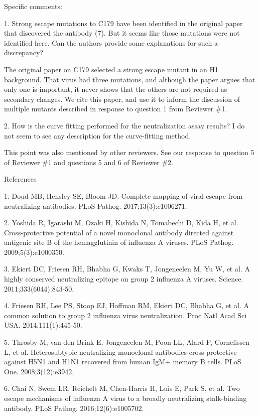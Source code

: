 \documentclass[11pt, oneside]{article}   	%
\begin{document}
Specific comments:

1.  Strong escape mutations to C179 have been identified in the original paper that discovered the antibody (7). But it seems like those mutations were not identified here. Can the authors provide some explanations for such a discrepancy?

{\color{black}
The original paper on C179 selected a strong escape mutant in an H1 background.
That virus had three mutations, and although the paper argues that only one is important, it never shows that the others are not required as secondary changes.
We cite this paper, and use it to inform the discussion of multiple mutants described in response to question 1 from Reviewer \#1.
}

2.  How is the curve fitting performed for the neutralization assay results? I do not seem to see any description for the curve-fitting method. 

{
\color{black}
This point was also mentioned by other reviewers.
See our response to question 5 of Reviewer \#1 and questions 5 and 6 of Reviewer \#2.}

References

1.  Doud MB, Hensley SE, Bloom JD. Complete mapping of viral escape from neutralizing antibodies. PLoS Pathog. 2017;13(3):e1006271.

2.  Yoshida R, Igarashi M, Ozaki H, Kishida N, Tomabechi D, Kida H, et al. Cross-protective potential of a novel monoclonal antibody directed against antigenic site B of the hemagglutinin of influenza A viruses. PLoS Pathog. 2009;5(3):e1000350.

3.  Ekiert DC, Friesen RH, Bhabha G, Kwaks T, Jongeneelen M, Yu W, et al. A highly conserved neutralizing epitope on group 2 influenza A viruses. Science. 2011;333(6044):843-50.

4.  Friesen RH, Lee PS, Stoop EJ, Hoffman RM, Ekiert DC, Bhabha G, et al. A common solution to group 2 influenza virus neutralization. Proc Natl Acad Sci USA. 2014;111(1):445-50.

5.  Throsby M, van den Brink E, Jongeneelen M, Poon LL, Alard P, Cornelissen L, et al. Heterosubtypic neutralizing monoclonal antibodies cross-protective against H5N1 and H1N1 recovered from human IgM+ memory B cells. PLoS One. 2008;3(12):e3942.

6.  Chai N, Swem LR, Reichelt M, Chen-Harris H, Luis E, Park S, et al. Two escape mechanisms of influenza A virus to a broadly neutralizing stalk-binding antibody. PLoS Pathog. 2016;12(6):e1005702.
\end{document}
